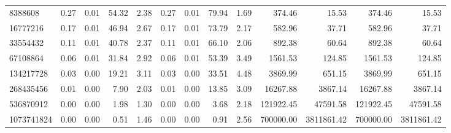 \begin{tabular}{lrrrrrrrrrrrr}
8388608 & 0.27 & 0.01 & 54.32 & 2.38 & 0.27 & 0.01 & 79.94 & 1.69 & 374.46 & 15.53 & 374.46 & 15.53 \\
16777216 & 0.17 & 0.01 & 46.94 & 2.67 & 0.17 & 0.01 & 73.79 & 2.17 & 582.96 & 37.71 & 582.96 & 37.71 \\
33554432 & 0.11 & 0.01 & 40.78 & 2.37 & 0.11 & 0.01 & 66.10 & 2.06 & 892.38 & 60.64 & 892.38 & 60.64 \\
67108864 & 0.06 & 0.01 & 31.84 & 2.92 & 0.06 & 0.01 & 53.39 & 3.49 & 1561.53 & 124.85 & 1561.53 & 124.85 \\
134217728 & 0.03 & 0.00 & 19.21 & 3.11 & 0.03 & 0.00 & 33.51 & 4.48 & 3869.99 & 651.15 & 3869.99 & 651.15 \\
268435456 & 0.01 & 0.00 & 7.90 & 2.03 & 0.01 & 0.00 & 13.85 & 3.09 & 16267.88 & 3867.14 & 16267.88 & 3867.14 \\
536870912 & 0.00 & 0.00 & 1.98 & 1.30 & 0.00 & 0.00 & 3.68 & 2.18 & 121922.45 & 47591.58 & 121922.45 & 47591.58 \\
1073741824 & 0.00 & 0.00 & 0.51 & 1.46 & 0.00 & 0.00 & 0.91 & 2.56 & 700000.00 & 3811861.42 & 700000.00 & 3811861.42 \\
\bottomrule
\end{tabular}
